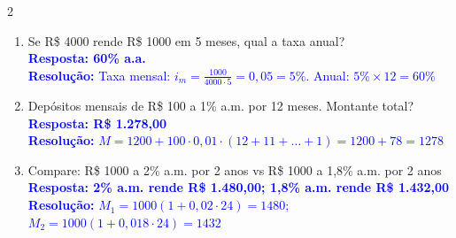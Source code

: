 \documentclass[11pt]{article}
\begin{document}
\begin{multicols}{2}
\begin{enumerate}[leftmargin=*, itemsep=2pt]
\item Se R\$ 4000 rende R\$ 1000 em 5 meses, qual a taxa anual? \\
\textcolor{blue}{\textbf{Resposta: 60\% a.a.}} \\
\textcolor{blue}{\textbf{Resolução:} Taxa mensal: $i_m = \frac{1000}{4000 \cdot 5} = 0,05 = 5\%$. Anual: $5\% \times 12 = 60\%$}

\item Depósitos mensais de R\$ 100 a 1\% a.m. por 12 meses. Montante total? \\
\textcolor{blue}{\textbf{Resposta: R\$ 1.278,00}} \\
\textcolor{blue}{\textbf{Resolução:} $M = 1200 + 100 \cdot 0,01 \cdot (12+11+\ldots+1) = 1200 + 78 = 1278$}

\item Compare: R\$ 1000 a 2\% a.m. por 2 anos vs R\$ 1000 a 1,8\% a.m. por 2 anos \\
\textcolor{blue}{\textbf{Resposta: 2\% a.m. rende R\$ 1.480,00; 1,8\% a.m. rende R\$ 1.432,00}} \\
\textcolor{blue}{\textbf{Resolução:} $M_1 = 1000(1 + 0,02 \cdot 24) = 1480$; $M_2 = 1000(1 + 0,018 \cdot 24) = 1432$}

\end{enumerate}

\end{multicols}
\end{document}
